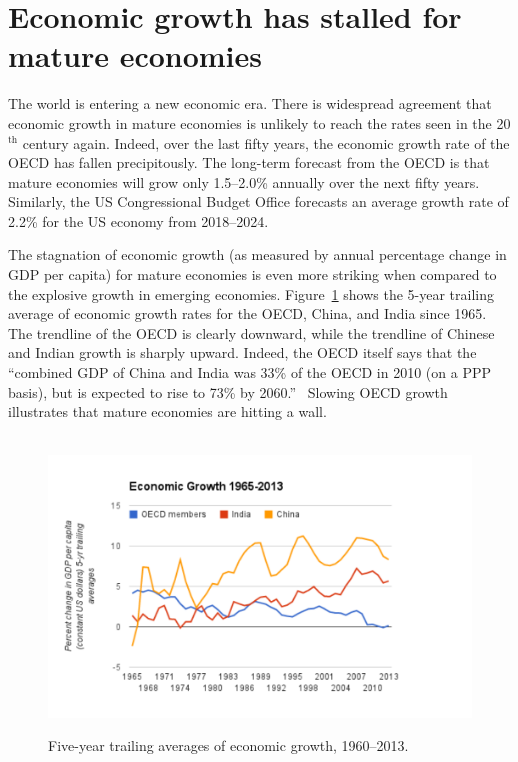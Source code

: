 \section{Economic growth  has stalled for mature economies} %
\label{sec:growth_has_slowed}

The world is entering a new economic era. 
There is widespread agreement that economic growth in mature economies 
is unlikely to reach the rates seen in the 20$^\mathrm{th}$ century again.  
Indeed, over the last fifty years, 
the economic growth rate of the OECD has fallen precipitously. 
The long-term forecast from the OECD is that mature economies 
will grow only 1.5--2.0\% annually over the next fifty years. 
Similarly, the US Congressional Budget Office forecasts 
an average growth rate of 2.2\% for the US economy 
from 2018--2024.\cite{OECD2014,CBO2014}

The stagnation of economic growth 
(as measured by annual percentage change in GDP per capita) 
for mature economies is even more striking 
when compared to the explosive growth in emerging economies. 
Figure~\ref{fig:gdppc} shows the 5-year trailing average 
of economic growth rates for the OECD, China, and India since 1965. 
The trendline of the OECD is clearly downward, 
while the trendline of Chinese and Indian growth is sharply upward.  
Indeed, the OECD itself says that the 
``combined GDP of China and India was 33\% of the OECD in 2010 
(on a PPP basis), 
but is expected to rise to 73\% by 2060.''~\cite[p. 214]{OECD2014} 
Slowing OECD growth illustrates that mature economies are hitting a wall.

\begin{figure}
\centering\
\includegraphics[width=\linewidth]{Part_0/Chapter_Introduction/images/GDPPC1.pdf}
\caption[Economic growth, 1960--2013]{Five-year trailing averages of economic growth, 
1960--2013.\cite{WorldBank2014}}
\label{fig:gdppc}
\end{figure}

